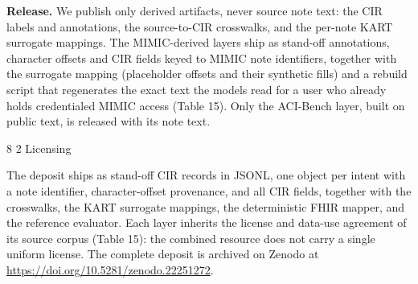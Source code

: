 \documentclass[3p,twocolumn]{elsarticle}
\makeatletter
\renewcommand\subsection{\@startsection{subsection}{2}{\z@}%
    {8\p@ \@plus 4\p@ \@minus 4\p@}%
    {2\p@ \@plus 4\p@ \@minus 3\p@}%
    {\normalfont\normalsize\itshape}}
\makeatother
\begin{document}
\textbf{Release.} We publish only derived artifacts, never source note text: the CIR labels and annotations, the source-to-CIR crosswalks, and the per-note KART surrogate mappings. The MIMIC-derived layers ship as stand-off annotations, character offsets and CIR fields keyed to MIMIC note identifiers, together with the surrogate mapping (placeholder offsets and their synthetic fills) and a rebuild script that regenerates the exact text the models read for a user who already holds credentialed MIMIC access (Table 15). Only the ACI-Bench layer, built on public text, is released with its note text.

\subsection{Licensing}\label{availability-and-licensing}

The deposit ships as stand-off CIR records in JSONL, one object per intent with a note identifier, character-offset provenance, and all CIR fields, together with the crosswalks, the KART surrogate mappings, the deterministic FHIR mapper, and the reference evaluator. Each layer inherits the license and data-use agreement of its source corpus (Table 15): the combined resource does not carry a single uniform license. The complete deposit is archived on Zenodo at \url{https://doi.org/10.5281/zenodo.22251272}.
\end{document}
